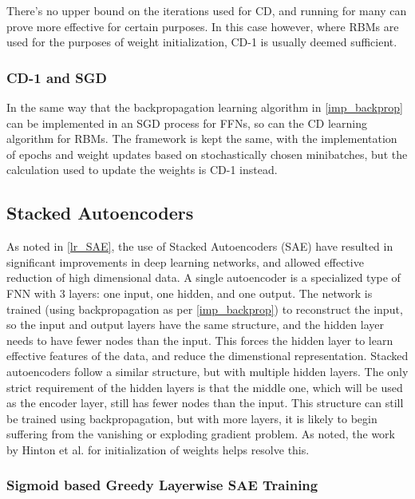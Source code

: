\documentclass[a4paper,latin]{paper}
\begin{document}
There's no upper bound on the iterations used for CD, and running for many can prove more effective for certain purposes. In this case however, where RBMs are used for the purposes of weight initialization, CD-1 is usually deemed sufficient.

\subsubsection{CD-1 and SGD}

In the same way that the backpropagation learning algorithm in \ref{imp_backprop} can be implemented in an SGD process for FFNs, so can the CD learning algorithm for RBMs. The framework is kept the same, with the implementation of epochs and weight updates based on stochastically chosen minibatches, but the calculation used to update the weights is CD-1 instead.


\subsection{Stacked Autoencoders}\label{imp_SAE}

As noted in \ref{lr_SAE}, the use of Stacked Autoencoders (SAE) have resulted in significant improvements in deep learning networks, and allowed effective reduction of high dimensional data. A single autoencoder is a specialized type of FNN with 3 layers: one input, one hidden, and one output. The network is trained (using backpropagation as per \ref{imp_backprop}) to reconstruct the input, so the input and output layers have the same structure, and the hidden layer needs to have fewer nodes than the input. This forces the hidden layer to learn effective features of the data, and reduce the dimenstional representation. 
\newline\newline
Stacked autoencoders follow a similar structure, but with multiple hidden layers. The only strict requirement of the hidden layers is that the middle one, which will be used as the encoder layer, still has fewer nodes than the input. This structure can still be trained using backpropagation, but with more layers, it is likely to begin suffering from the vanishing or exploding gradient problem. As noted, the work by Hinton et al. for initialization of weights helps resolve this.

\subsubsection{Sigmoid based Greedy Layerwise SAE Training}\label{imp_sigmoidsae}
\end{document}
